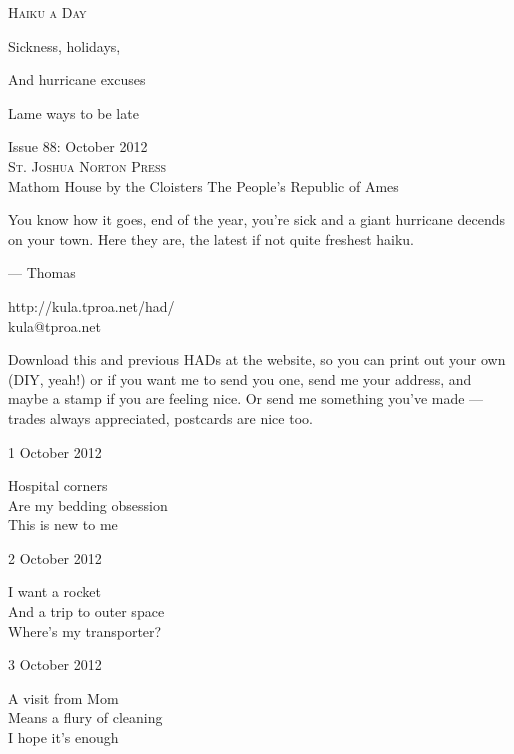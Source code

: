 \documentclass[12pt]{article}
\begin{document}
\begin{center}
{\fontsize{36}{48}\selectfont \textsc{Haiku a Day }}
\end{center}

\vspace*{3.5cm}

{\fontsize{20}{40}\selectfont 

Sickness, holidays,

And hurricane excuses

Lame ways to be late


}

\vspace*{5.0cm}
\begin{center}
{\large{Issue 88: October 2012}} \\[5mm]
{\fontsize{8}{8}\selectfont  \textsc{ St. Joshua Norton Press }} \\[1mm]
{\fontsize{6}{6}\selectfont Mathom House by the Cloisters \textbar The People's Republic of Ames }
\end{center}


\newpage

You know how it goes, end of the year, you're sick and a giant hurricane
decends on your town. Here they are, the latest if not quite freshest
haiku.

--- Thomas

http://kula.tproa.net/had/ \\
kula@tproa.net

Download this and previous HADs at the website, so you can
print out your own (DIY, yeah!) or if you want me to send
you one, send me your address, and maybe a stamp if you
are feeling nice. Or send me something you've made ---
trades always appreciated, postcards are nice too.

\vfill

1 October 2012

Hospital corners \\
Are my bedding obsession \\
This is new to me

2 October 2012

I want a rocket \\
And a trip to outer space \\
Where's my transporter?

3 October 2012

A visit from Mom \\
Means a flury of cleaning \\
I hope it's enough
\end{document}
